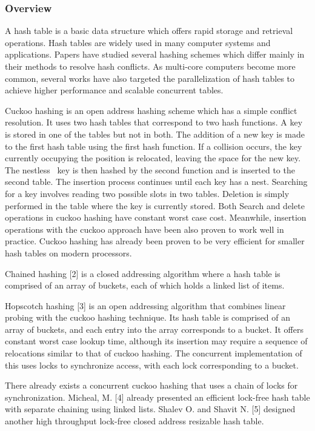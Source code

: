 \documentclass{article}
\begin{document}
\subsubsection{Overview}
A hash table is a basic data structure which offers rapid storage and retrieval operations. Hash tables are widely used
in many computer systems and applications. Papers have studied several hashing schemes which differ mainly in their
methods to resolve hash conflicts. As multi-core computers become more common, several works have also targeted the
parallelization of hash tables to achieve higher performance and scalable concurrent tables. 

Cuckoo hashing is an open address hashing scheme which has a simple conflict resolution. It uses two hash tables that
correspond to two hash functions. A key is stored in one of the tables but not in both. The addition of a new key is
made to the first hash table using the first hash function. If a collision occurs, the key currently occupying the
position is relocated, leaving the space for the new key. The nestless \ key is then hashed by the second function and
is inserted to the second table. The insertion process continues until each key has a nest. Searching for a key
involves reading two possible slots in two tables. Deletion is simply performed in the table where the key is currently
stored. Both Search and delete operations in cuckoo hashing have constant worst case cost. Meanwhile, insertion
operations with the cuckoo approach have been also proven to work well in practice. Cuckoo hashing has already been
proven to be very efficient for smaller hash tables on modern processors.

Chained hashing [2] is a closed addressing algorithm where a hash table is comprised of an array of buckets, each of
which holds a linked list of items.

Hopscotch hashing [3] is an open addressing algorithm that combines linear probing with the cuckoo hashing technique.
Its hash table is comprised of an array of buckets, and each entry into the array corresponds to a bucket. It offers
constant worst case lookup time, although its insertion may require a sequence of relocations similar to that of cuckoo
hashing. The concurrent implementation of this uses locks to synchronize access, with each lock corresponding to a
bucket.

There already exists a concurrent cuckoo hashing that uses a chain of locks for synchronization. Micheal, M. [4] already
presented an efficient lock-free hash table with separate chaining using linked lists. Shalev O. and Shavit N. [5]
designed another high throughput lock-free closed address resizable hash table.
\end{document}
